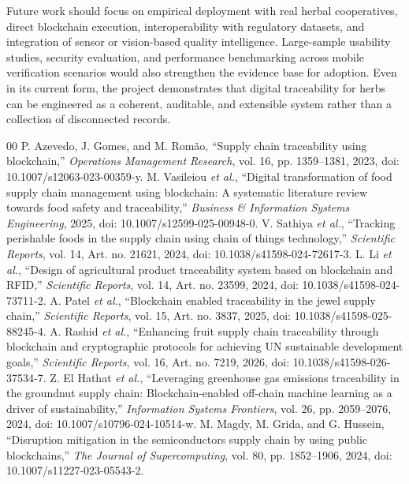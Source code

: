 \documentclass[conference]{IEEEtran}
\begin{document}
Future work should focus on empirical deployment with real herbal cooperatives, direct blockchain execution, interoperability with regulatory datasets, and integration of sensor or vision-based quality intelligence. Large-sample usability studies, security evaluation, and performance benchmarking across mobile verification scenarios would also strengthen the evidence base for adoption. Even in its current form, the project demonstrates that digital traceability for herbs can be engineered as a coherent, auditable, and extensible system rather than a collection of disconnected records.

\begin{thebibliography}{00}
 P. Azevedo, J. Gomes, and M. Rom\~ao, ``Supply chain traceability using blockchain,'' \emph{Operations Management Research}, vol. 16, pp. 1359--1381, 2023, doi: 10.1007/s12063-023-00359-y.
 M. Vasileiou \emph{et al.}, ``Digital transformation of food supply chain management using blockchain: A systematic literature review towards food safety and traceability,'' \emph{Business \& Information Systems Engineering}, 2025, doi: 10.1007/s12599-025-00948-0.
 V. Sathiya \emph{et al.}, ``Tracking perishable foods in the supply chain using chain of things technology,'' \emph{Scientific Reports}, vol. 14, Art. no. 21621, 2024, doi: 10.1038/s41598-024-72617-3.
 L. Li \emph{et al.}, ``Design of agricultural product traceability system based on blockchain and RFID,'' \emph{Scientific Reports}, vol. 14, Art. no. 23599, 2024, doi: 10.1038/s41598-024-73711-2.
 A. Patel \emph{et al.}, ``Blockchain enabled traceability in the jewel supply chain,'' \emph{Scientific Reports}, vol. 15, Art. no. 3837, 2025, doi: 10.1038/s41598-025-88245-4.
 A. Rashid \emph{et al.}, ``Enhancing fruit supply chain traceability through blockchain and cryptographic protocols for achieving UN sustainable development goals,'' \emph{Scientific Reports}, vol. 16, Art. no. 7219, 2026, doi: 10.1038/s41598-026-37534-7.
 Z. El Hathat \emph{et al.}, ``Leveraging greenhouse gas emissions traceability in the groundnut supply chain: Blockchain-enabled off-chain machine learning as a driver of sustainability,'' \emph{Information Systems Frontiers}, vol. 26, pp. 2059--2076, 2024, doi: 10.1007/s10796-024-10514-w.
 M. Magdy, M. Grida, and G. Hussein, ``Disruption mitigation in the semiconductors supply chain by using public blockchains,'' \emph{The Journal of Supercomputing}, vol. 80, pp. 1852--1906, 2024, doi: 10.1007/s11227-023-05543-2.

\end{thebibliography}
\end{document}
